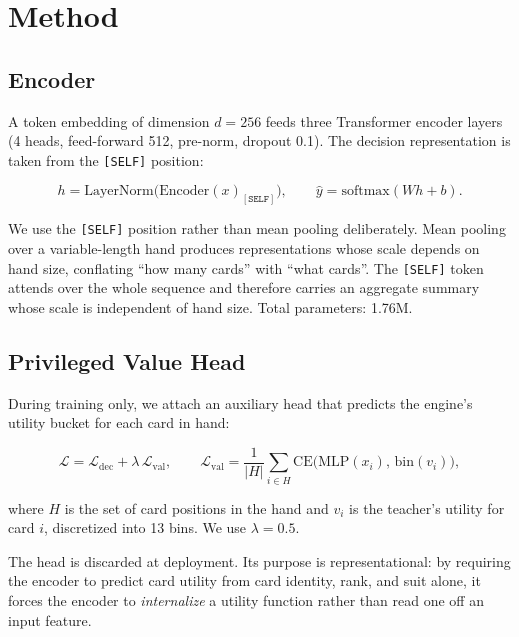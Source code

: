\documentclass[11pt]{article}
\begin{document}
\section{Method}
\label{sec:method}

\subsection{Encoder}

A token embedding of dimension $d=256$ feeds three Transformer encoder layers (4 heads, feed-forward 512, pre-norm, dropout 0.1). The decision representation is taken from the \texttt{[SELF]} position:

\begin{equation}
h = \mathrm{LayerNorm}\big(\mathrm{Encoder}(x)_{[\texttt{SELF}]}\big), \qquad
\hat{y} = \mathrm{softmax}(W h + b).
\end{equation}

We use the \texttt{[SELF]} position rather than mean pooling deliberately. Mean pooling over a variable-length hand produces representations whose scale depends on hand size, conflating ``how many cards'' with ``what cards''. The \texttt{[SELF]} token attends over the whole sequence and therefore carries an aggregate summary whose scale is independent of hand size. Total parameters: 1.76M.

\subsection{Privileged Value Head}

During training only, we attach an auxiliary head that predicts the engine's utility bucket for each card in hand:

\begin{equation}
\mathcal{L} = \mathcal{L}_{\mathrm{dec}} + \lambda \, \mathcal{L}_{\mathrm{val}},
\qquad
\mathcal{L}_{\mathrm{val}} = \frac{1}{|H|}\sum_{i \in H} \mathrm{CE}\big(\mathrm{MLP}(x_i),\, \mathrm{bin}(v_i)\big),
\end{equation}

where $H$ is the set of card positions in the hand and $v_i$ is the teacher's utility for card $i$, discretized into 13 bins. We use $\lambda = 0.5$.

The head is discarded at deployment. Its purpose is representational: by requiring the encoder to predict card utility from card identity, rank, and suit alone, it forces the encoder to \emph{internalize} a utility function rather than read one off an input feature.
\end{document}
